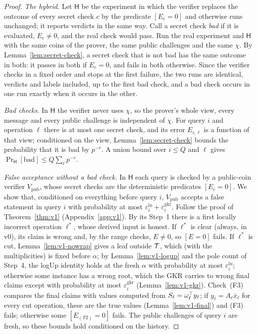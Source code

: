 \begin{proof}
\emph{The hybrid.} Let $\mathsf H$ be the experiment in which the verifier replaces the outcome of
every secret check $c$ by the predicate $[E_c=0]$ and otherwise runs unchanged; it reports verdicts
in the same way. Call a secret check \emph{bad} if it is evaluated, $E_c\neq0$, and the real check
would pass. Run the real experiment and $\mathsf H$ with the same coins of the prover, the same public
challenges and the same $\chi$. By Lemma~\ref{lem:secret-check}, a secret check that is not bad has
the same outcome in both: it passes in both if $E_c=0$, and fails in both otherwise. Since the
verifier checks in a fixed order and stops at the first failure, the two runs are identical, verdicts
and labels included, up to the first bad check, and a bad check occurs in one run exactly when it
occurs in the other.

\emph{Bad checks.} In $\mathsf H$ the verifier never uses $\chi$, so the prover's whole view, every
message and every public challenge is independent of $\chi$. For query $i$ and operation $\ell$
there is at most one secret check, and its error $E_{i,\ell}$ is a function of that view;
conditioned on the view, Lemma~\ref{lem:secret-check} bounds the probability that it is bad by
$p^{-r}$. A union bound over $i\le Q$ and $\ell$ gives $\Pr_{\mathsf H}[\text{bad}]\le
Q\sum_\ell p^{-r}$.

\emph{False acceptance without a bad check.} In $\mathsf H$ each query is checked by a public-coin
verifier $V_{\mathrm{pub}}$, whose secret checks are the deterministic predicates $[E_c=0]$. We show
that, conditioned on everything before query $i$, $V_{\mathrm{pub}}$ accepts a false statement in
query $i$ with probability at most $\varepsilon^{\mathrm{lu}}_i+\varepsilon^{\mathrm{gkr}}_i$. Follow the proof of Theorem~\ref{thm:v1}
(Appendix~\ref{app:v1}). By its Step~1 there is a first locally incorrect operation $\ell^\ast$,
whose derived input is honest. If $\ell^\ast$ is clear (always, in v0), its claim is wrong and, by
the range checks, $E\neq0$, so $[E=0]$ fails. If $\ell^\ast$ is cut, Lemma~\ref{lem:v1-nowrap} gives
a leaf outside $\mathcal{T}$, which (with the multiplicities) is fixed before $\alpha$; by
Lemma~\ref{lem:v1-logup} and the pole count of Step~4, the logUp identity holds at the fresh
$\alpha$ with probability at most $\varepsilon^{\mathrm{lu}}_i$; otherwise some instance has a wrong root, which the
GKR carries to wrong final claims except with probability at most $\varepsilon^{\mathrm{gkr}}_i$
(Lemma~\ref{lem:v1-gkr}). Check~(F3) compares the final claims with values computed from
$S_\ell=\omega_\ell^\top y_\ell$; if $y_\ell=A_\ell\bar x_\ell$ for every cut operation, these are the
true values (Lemma~\ref{lem:v1-final}) and (F3) fails; otherwise some $[E_{(F2)}=0]$ fails. The
public challenges of query $i$ are fresh, so these bounds hold conditioned on the history.


\end{proof}
